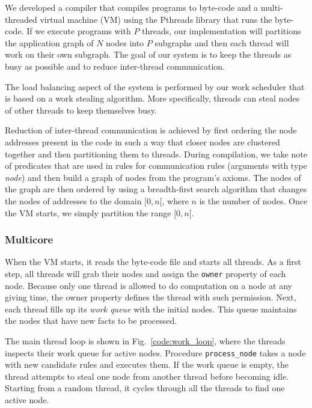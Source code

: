 
We developed a compiler that compiles programs to byte-code and a multi-threaded
virtual machine (VM) using the Pthreads library that runs the byte-code.
If we execute programs with $P$ threads, our implementation will partitions the application
graph of $N$ nodes into $P$ subgraphs and then each thread will work on their own subgraph.
The goal of our system is to keep the threads as busy as possible and to reduce inter-thread communication.

The load balancing aspect of the system is performed by our work scheduler that is based on a work
stealing algorithm. More specifically, threads can steal nodes of other threads to keep themselves busy.

Reduction of inter-thread communication is achieved by first ordering the node addresses present
in the code in such a way that closer nodes are clustered together and then partitioning them
to threads.
During compilation, we take note of predicates that are used in rules for
communication rules (arguments with type \emph{node}) and then build a graph of nodes from
the program's axioms. The nodes of the graph are then ordered by using a breadth-first search
algorithm that changes the nodes of addresses to the domain $[0, n[$, where $n$ is the number of
nodes. Once the VM starts, we simply partition the range
$[0, n[$.

\subsubsection{Multicore}

When the VM starts, it reads the byte-code file and starts all threads.
As a first step, all threads will grab their nodes and assign the \texttt{owner} property of each node.
Because only one thread is allowed to do computation on a node at any giving time, the owner property
defines the thread with such permission.
Next, each thread fills up its \emph{work queue} with the initial nodes. This queue
maintains the nodes that have new facts to be processed.

The main thread loop is shown in Fig.~\ref{code:work_loop}, where the threads
inspects their work queue for active nodes. Procedure \texttt{process\_node} takes a node with new candidate rules
and executes them. If the work queue is empty, the thread attempts to steal one node from another thread before
becoming idle. Starting from a random thread, it cycles through all the threads to find one active node.

